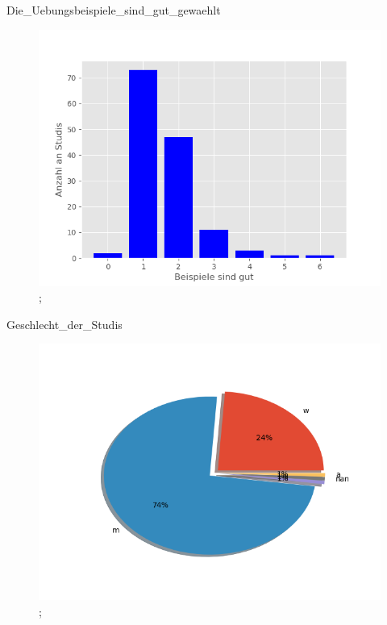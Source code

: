 \documentclass[10pt]{beamer}
\begin{document}
\begin{frame}[fragile]{Die_Uebungsbeispiele_sind_gut_gewaehlt} 
 \begin{figure}
 \includegraphics[width= 0.9\linewidth]{./PDFcreater/Plots/Die_Uebungsbeispiele_sind_gut_gewaehlt.png};
 \end{figure}
 \end{frame}
\begin{frame}[fragile]{Geschlecht_der_Studis} 
 \begin{figure}
 \includegraphics[width= 0.9\linewidth]{./PDFcreater/Plots/Geschlecht_der_Studis.png};
 \end{figure}
 \end{frame}
\end{document}
